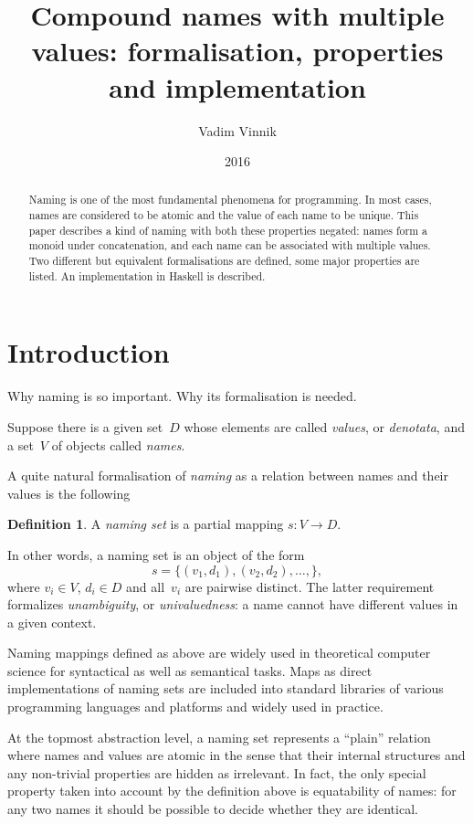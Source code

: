 \documentclass{article}
\title{Compound names with multiple values: formalisation, properties and implementation}
\author{Vadim Vinnik}
\date{2016}
\theoremstyle{definition}
\newtheorem{Df}{Definition}
\begin{document}
\maketitle

\begin{abstract}
Naming is one of the most fundamental phenomena for programming.  In most
cases, names are considered to be atomic and the value of each name to be
unique.  This paper describes a kind of naming with both these properties
negated: names form a monoid under concatenation, and each name can be
associated with multiple values.  Two different but equivalent formalisations
are defined, some major properties are listed.  An implementation in Haskell is
described.
\end{abstract}

\tableofcontents

\section{Introduction}

Why naming is so important. Why its formalisation is needed.

Suppose there is a given set~$D$ whose elements are called \emph{values}, or
\emph{denotata}, and a set~$V$ of objects called \emph{names}.

A quite natural formalisation of \emph{naming} as a relation between names and
their values is the following
\begin{Df}\label{df:naming-set}
A \emph{naming set} is a partial mapping $s: V\to D$.
\end{Df}

In other words, a naming set is an object of the form
\[
  s = \{ (v_1, d_1), (v_2, d_2), \ldots, \} ,
\]
where $v_i\in V$, $d_i\in D$ and all~$v_i$ are pairwise distinct. The
latter requirement formalizes \emph{unambiguity}, or \emph{univaluedness}: a
name cannot have different values in a given context.

Naming mappings defined as above are widely used in theoretical computer
science for syntactical as well as semantical tasks.
Maps as direct
implementations of naming sets are included into standard libraries of various
programming languages and platforms and widely used in practice.

At the topmost abstraction level, a naming set represents a ``plain''
relation where names and values are atomic in the sense that their internal
structures and any non-trivial properties are hidden as irrelevant. In
fact, the only special property taken into account by the definition above is
equatability of names: for any two names it should be possible to decide
whether they are identical.
\end{document}
